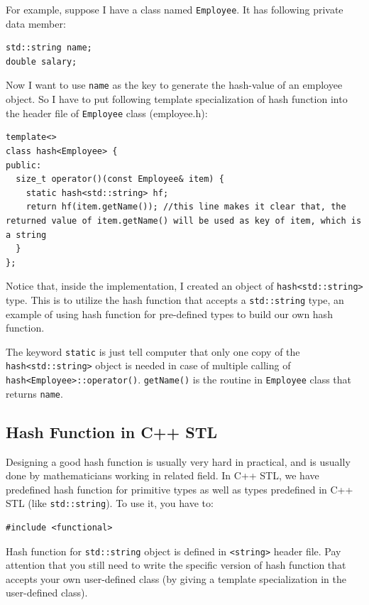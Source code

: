 \documentclass[11pt]{book}
\begin{document}
For example, suppose I have a class named \texttt{Employee}. It has following private data member:
\begin{verbatim}
std::string name;
double salary;
\end{verbatim}

Now I want to use \texttt{name} as the key to generate the hash-value of an employee object. So I have to put following template specialization of hash function into the header file of \texttt{Employee} class (employee.h):
\begin{verbatim}
template<>
class hash<Employee> {
public:
  size_t operator()(const Employee& item) {
    static hash<std::string> hf;
    return hf(item.getName()); //this line makes it clear that, the returned value of item.getName() will be used as key of item, which is a string
  }
};
\end{verbatim}

Notice that, inside the implementation, I created an object of \texttt{hash<std::string>} type. This is to utilize the hash function that accepts a \texttt{std::string} type, an example of using hash function for pre-defined types to build our own hash function.

The keyword \texttt{static} is just tell computer that only one copy of the \texttt{hash<std::string>} object is needed in case of multiple calling of \texttt{hash<Employee>::operator()}. \texttt{getName()} is the routine in \texttt{Employee} class that returns \texttt{name}.


\subsection{Hash Function in C++ STL}
\label{sec:org05d53ea}

Designing a good hash function is usually very hard in practical, and is usually done by mathematicians working in related field. In C++ STL, we have predefined hash function for primitive types as well as types predefined in C++ STL (like \texttt{std::string}). To use it, you have to:
\begin{verbatim}
#include <functional>
\end{verbatim}

Hash function for \texttt{std::string} object is defined in \texttt{<string>} header file. Pay attention that you still need to write the specific version of hash function that accepts your own user-defined class (by giving a template specialization in the user-defined class).
\end{document}
